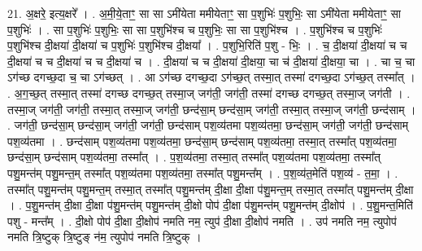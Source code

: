 \documentclass[17pt]{extarticle}
\begin{document}
21. अ॒क्षरे॒ इत्य॒क्षरे᳚ । . अ॒मी॒ये॒ताꣳ॒॒ सा सा ऽमी॑येता ममीयेताꣳ॒॒ सा प॒शुभिः॑ प॒शुभिः॒ सा ऽमी॑येता ममीयेताꣳ॒॒ सा प॒शुभिः॑ । . सा प॒शुभिः॑ प॒शुभिः॒ सा सा प॒शुभि॑श्च च प॒शुभिः॒ सा सा प॒शुभि॑श्च । . प॒शुभि॑श्च च प॒शुभिः॑ प॒शुभि॑श्च दी॒क्षया॑ दी॒क्षया॑ च प॒शुभिः॑ प॒शुभि॑श्च दी॒क्षया᳚ । . प॒शुभि॒रिति॑ प॒शु - भिः॒ । . च॒ दी॒क्षया॑ दी॒क्षया॑ च च दी॒क्षया॑ च च दी॒क्षया॑ च च दी॒क्षया॑ च । . दी॒क्षया॑ च च दी॒क्षया॑ दी॒क्षया॒ चा च॑ दी॒क्षया॑ दी॒क्षया॒ चा । . चा च॒ चा ऽग॑च्छ दगच्छ॒दा च॒ चा ऽग॑च्छत् । . आ ऽग॑च्छ दगच्छ॒दा ऽग॑च्छ॒त् तस्मा॒त् तस्मा॑ दगच्छ॒दा ऽग॑च्छ॒त् तस्मा᳚त् । . अ॒ग॒च्छ॒त् तस्मा॒त् तस्मा॑ दगच्छ दगच्छ॒त् तस्मा॒ज् जग॑ती॒ जग॑ती॒ तस्मा॑ दगच्छ दगच्छ॒त् तस्मा॒ज् जग॑ती । . तस्मा॒ज् जग॑ती॒ जग॑ती॒ तस्मा॒त् तस्मा॒ज् जग॑ती॒ छन्द॑सा॒म् छन्द॑सा॒म् जग॑ती॒ तस्मा॒त् तस्मा॒ज् जग॑ती॒ छन्द॑साम् । . जग॑ती॒ छन्द॑सा॒म् छन्द॑सा॒म् जग॑ती॒ जग॑ती॒ छन्द॑साम् पश॒व्य॑तमा पश॒व्य॑तमा॒ छन्द॑सा॒म् जग॑ती॒ जग॑ती॒ छन्द॑साम् पश॒व्य॑तमा । . छन्द॑साम् पश॒व्य॑तमा पश॒व्य॑तमा॒ छन्द॑सा॒म् छन्द॑साम् पश॒व्य॑तमा॒ तस्मा॒त् तस्मा᳚त् पश॒व्य॑तमा॒ छन्द॑सा॒म् छन्द॑साम् पश॒व्य॑तमा॒ तस्मा᳚त् । . प॒श॒व्य॑तमा॒ तस्मा॒त् तस्मा᳚त् पश॒व्य॑तमा पश॒व्य॑तमा॒ तस्मा᳚त् पशु॒मन्त॑म् पशु॒मन्त॒म् तस्मा᳚त् पश॒व्य॑तमा पश॒व्य॑तमा॒ तस्मा᳚त् पशु॒मन्त᳚म् । . प॒श॒व्य॑त॒मेति॑ पश॒व्य॑ - त॒मा॒ । . तस्मा᳚त् पशु॒मन्त॑म् पशु॒मन्त॒म् तस्मा॒त् तस्मा᳚त् पशु॒मन्त॑म् दी॒क्षा दी॒क्षा प॑शु॒मन्त॒म् तस्मा॒त् तस्मा᳚त् पशु॒मन्त॑म् दी॒क्षा । . प॒शु॒मन्त॑म् दी॒क्षा दी॒क्षा प॑शु॒मन्त॑म् पशु॒मन्त॑म् दी॒क्षो पोप॑ दी॒क्षा प॑शु॒मन्त॑म् पशु॒मन्त॑म् दी॒क्षोप॑ । . प॒शु॒मन्त॒मिति॑ पशु - मन्त᳚म् । . दी॒क्षो पोप॑ दी॒क्षा दी॒क्षोप॑ नमति नम॒ त्युप॑ दी॒क्षा दी॒क्षोप॑ नमति । . उप॑ नमति नम॒ त्युपोप॑ नमति त्रि॒ष्टुक् त्रि॒ष्टुङ् न॑म॒ त्युपोप॑ नमति त्रि॒ष्टुक् । \newline
\end{document}

